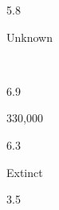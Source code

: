 \begin{description}[font=\normalfont,style=nextline]
\item[\langnameFitzroy] 
 \begin{multicols}{2}\begin{description}[font=\normalfont\itshape,noitemsep] 
 \item[] 
 \item[\pbnumberabbr] 5.8 
 \item[\family] \famPamaNyungan 
 \item[]
\item[\nativespeakers] Unknown 
 \item[\region] \regionQueensland\ \Brackets{\regionAustralia} 
 \end{description}\end{multicols}
\item[\langnameGee] 
 \begin{multicols}{2}\begin{description}[font=\normalfont\itshape,noitemsep] 
 \item[] 
 \item[\pbnumberabbr] 6.9 
 \item[\family] \famNigerCongo 
 \item[]
\item[\nativespeakers] 330,000 
 \item[\region] \regionTogo\EnumComma\regionBenin 
 \end{description}\end{multicols}
\item[\langnameGeez] 
 \begin{multicols}{2}\begin{description}[font=\normalfont\itshape,noitemsep] 
 \item[] 
 \item[\pbnumberabbr] 6.3 
 \item[\family] \famAfroasiatic 
 \item[]
\item[\nativespeakers] Extinct 
 \item[\region] \regionEritrea\EnumComma\regionEthiopia 
 \end{description}\end{multicols}
\item[\langnameGreek] 
 \begin{multicols}{2}\begin{description}[font=\normalfont\itshape,noitemsep] 
 \item[] 
 \item[\pbnumberabbr] 3.5 
 \item[\family] \famIndoEuropean 

\end{description}
\end{multicols}
\end{description}
